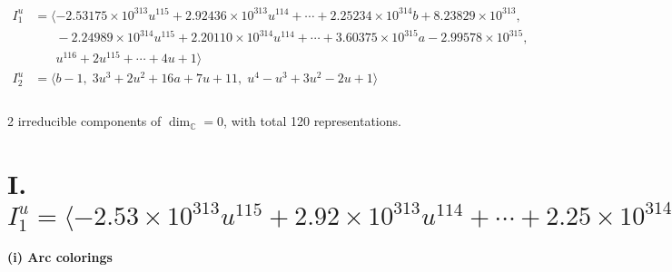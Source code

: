 \documentclass[1p]{elsarticle_modified}
\theoremstyle{definition}
\begin{document}
\begin{align*}
I^u_{1}&=\langle 
-2.53175\times10^{313} u^{115}+2.92436\times10^{313} u^{114}+\cdots+2.25234\times10^{314} b+8.23829\times10^{313},\\
\phantom{I^u_{1}}&\phantom{= \langle  }-2.24989\times10^{314} u^{115}+2.20110\times10^{314} u^{114}+\cdots+3.60375\times10^{315} a-2.99578\times10^{315},\\
\phantom{I^u_{1}}&\phantom{= \langle  }u^{116}+2 u^{115}+\cdots+4 u+1\rangle \\
I^u_{2}&=\langle 
b-1,\;3 u^3+2 u^2+16 a+7 u+11,\;u^4- u^3+3 u^2-2 u+1\rangle \\
\\
\end{align*}
\raggedright * 2 irreducible components of $\dim_{\mathbb{C}}=0$, with total 120 representations.\\
\newpage
\renewcommand{\arraystretch}{1}
\centering \section*{I. $I^u_{1}= \langle -2.53\times10^{313} u^{115}+2.92\times10^{313} u^{114}+\cdots+2.25\times10^{314} b+8.24\times10^{313},\;-2.25\times10^{314} u^{115}+2.20\times10^{314} u^{114}+\cdots+3.60\times10^{315} a-3.00\times10^{315},\;u^{116}+2 u^{115}+\cdots+4 u+1 \rangle$}
\flushleft \textbf{(i) Arc colorings}\\
\end{document}
